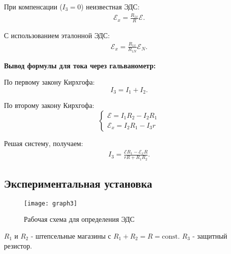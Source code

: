 При компенсации ($I_3 = 0$) неизвестная ЭДС:
\begin{align} \label{eq:6}
	\mathcal{E}_x = \frac{R_{1x}}{R} \mathcal{E}.
\end{align}

С использованием эталонной ЭДС:
\begin{align} \label{eq:7}
	\mathcal{E}_x = \frac{R_{1x}}{R_{1N}} \mathcal{E}_N.
\end{align}

\textbf{Вывод формулы для тока через гальванометр:}

По первому закону Кирхгофа:
\[
I_3 = I_1 + I_2.
\]

По второму закону Кирхгофа:
\[
\begin{cases}
	\mathcal{E} = I_1 R_2 - I_2 R_1 \\
	\mathcal{E}_x = I_2 R_1 - I_3 r
\end{cases}
\]

Решая систему, получаем:
\begin{align} \label{eq:8}
	I_3 = \frac{\mathcal{E} R_1 - \mathcal{E}_x R}{rR + R_1 R_2}.
\end{align}

\subsection{Экспериментальная установка}
\begin{figure}[H]
	\centering
	\texttt{[image: graph3]}
	\caption{Рабочая схема для определения ЭДС}
	\label{fig:3}
\end{figure}

$R_1$ и $R_2$ - штепсельные магазины с $R_1 + R_2 = R = \text{const}$. $R_3$ - защитный резистор.